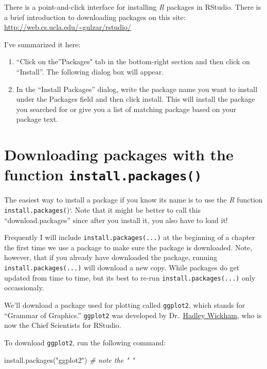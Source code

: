 \documentclass[
]{book}
\newenvironment{Shaded}{\begin{snugshade}}{\end{snugshade}}
\newcommand{\CommentTok}[1]{\textcolor[rgb]{0.56,0.35,0.01}{\textit{#1}}}
\newcommand{\FunctionTok}[1]{\textcolor[rgb]{0.00,0.00,0.00}{#1}}
\newcommand{\NormalTok}[1]{#1}
\newcommand{\StringTok}[1]{\textcolor[rgb]{0.31,0.60,0.02}{#1}}
\providecommand{\tightlist}{%
  \setlength{\itemsep}{0pt}\setlength{\parskip}{0pt}}
\begin{document}
There is a point-and-click interface for installing \emph{R} packages in RStudio. There is a brief introduction to downloading packages on this site: \url{http://web.cs.ucla.edu/~gulzar/rstudio/}

I've summarized it here:

\begin{enumerate}
\def\labelenumi{\arabic{enumi}.}
\tightlist
\item
  ``Click on the''Packages" tab in the bottom-right section and then click on ``Install''. The following dialog box will appear.
\item
  In the ``Install Packages'' dialog, write the package name you want to install under the Packages field and then click install. This will install the package you searched for or give you a list of matching package based on your package text.
\end{enumerate}

\hypertarget{downloading-packages-with-the-function-install.packages}{%
\section{\texorpdfstring{Downloading packages with the function \texttt{install.packages()}}{Downloading packages with the function install.packages()}}\label{downloading-packages-with-the-function-install.packages}}

The easiest way to install a package if you know its name is to use the \emph{R} function \texttt{install.packages(})`. Note that it might be better to call this ``download.packages'' since after you install it, you also have to load it!

Frequently I will include \texttt{install.packages(...)} at the beginning of a chapter the first time we use a package to make sure the package is downloaded. Note, however, that if you already have downloaded the package, running \texttt{install.packages(...)} will download a new copy. While packages do get updated from time to time, but its best to re-run \texttt{install.packages(...)} only occassionaly.

We'll download a package used for plotting called \texttt{ggplot2}, which stands for ``Grammar of Graphics.'' \texttt{ggplot2} was developed by Dr.~\href{http://hadley.nz/}{Hadley Wickham}, who is now the Chief Scientists for RStudio.

To download \texttt{ggplot2}, run the following command:

\begin{Shaded}
\begin{Highlighting}[]
\FunctionTok{install.packages}\NormalTok{(}\StringTok{"ggplot2"}\NormalTok{) }\CommentTok{\# note the " "}
\end{Highlighting}
\end{Shaded}
\end{document}
